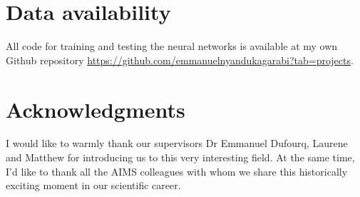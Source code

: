 \documentclass[conference]{IEEEtran}
\begin{document}
\section*{Data availability}
All code for training and testing the neural networks is available at my own Github repository  \url{https://github.com/emmanuelnyandukagarabi?tab=projects}.
\section*{Acknowledgments}
I would like to warmly thank our supervisors Dr Emmanuel Dufourq, Laurene and Matthew for introducing us to this very interesting field. At the same time, I'd like to thank all the AIMS colleagues with whom we share this historically exciting moment in our scientific career.


	
\end{document}
